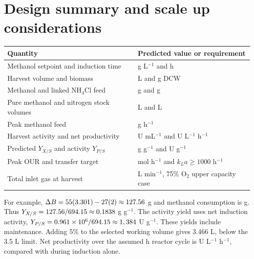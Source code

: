 \documentclass[12pt,a4paper]{article}
\newcommand{\tighttable}{\setstretch{1.07}}
\begin{document}
\section{Design summary and scale up considerations}
\begin{center}\tighttable
{}
\begin{tabularx}{\textwidth}{@{}L{0.47\textwidth}Y@{}}\toprule
Quantity & Predicted value or requirement\\\midrule
Methanol setpoint and induction time & \Setpoint{} g L$^{-1}$ and \FinalTime{} h\\
Harvest volume and biomass & \FinalVolume{} L and \FinalBiomass{} g DCW\\
Methanol and linked NH$_4$Cl feed & \MethanolFed{} g and \NitrogenMass{} g\\
Pure methanol and nitrogen stock volumes & \MethanolVolume{} L and \NitrogenVolume{} L\\
Peak methanol feed & \MaxFeed{} g h$^{-1}$\\
Harvest activity and net productivity & \FinalActivity{} U mL$^{-1}$ and \FinalProductivity{} U L$^{-1}$ h$^{-1}$\\
Predicted $Y_{X/S}$ and activity $Y_{P/S}$ & \BiomassYield{} g g$^{-1}$ and \ActivityYield{} U g$^{-1}$\\
Peak OUR and transfer target & \PeakOUR{} mol h$^{-1}$ and $k_La\geq1000$ h$^{-1}$\\
Total inlet gas at harvest & \GasFlow{} L min$^{-1}$, 75\% O$_2$ upper capacity case\\\bottomrule
\end{tabularx}
\end{center}
For example, $\Delta B=55(3.301)-27(2)\approx127.56$ g and methanol consumption is \MethanolConsumed{} g. Thus $Y_{X/S}=127.56/694.15\approx0.1838$ g g$^{-1}$. The activity yield uses net induction activity, $Y_{P/S}=0.961\times10^6/694.15\approx1,384$ U g$^{-1}$. These yields include maintenance. Adding 5\% to the selected working volume gives 3.466 L, below the 3.5 L limit. Net productivity over the assumed \Occupancy{} h reactor cycle is \CycleProductivity{} U L$^{-1}$ h$^{-1}$, compared with \FinalProductivity{} during induction alone.
\end{document}
